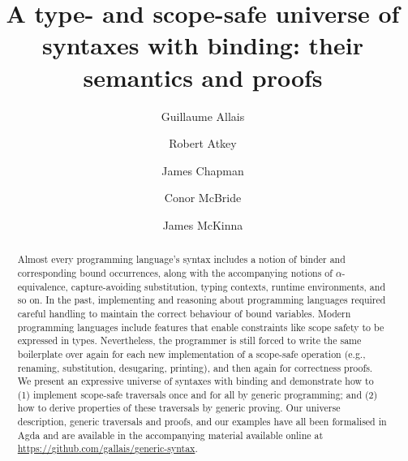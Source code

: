 \documentclass{jfp}
\begin{document}


\totalpg{\pageref{lastpage01}}

\title{A type- and scope-safe universe of syntaxes with binding: their semantics and proofs}

\begin{authgrp}
  \author{Guillaume Allais}\\
  \author{Robert Atkey}
  \author{James Chapman}
  \author{Conor McBride}
  \author{James McKinna}
\end{authgrp}


\begin{abstract}
Almost every programming language's syntax includes a notion of binder
and corresponding bound occurrences, along with the accompanying
notions of $\alpha$-equivalence, capture-avoiding substitution, typing
contexts, runtime environments, and so on. In the past, implementing
and reasoning about programming languages required careful handling to
maintain the correct behaviour of bound variables. Modern programming
languages include features that enable constraints like scope safety
to be expressed in types. Nevertheless, the programmer is still forced
to write the same boilerplate over again for each new implementation
of a scope-safe operation (e.g., renaming, substitution, desugaring,
printing), and then again for correctness proofs.
We present an expressive universe of syntaxes with binding and
demonstrate how to (1) implement scope-safe traversals once and for
all by generic programming; and (2) how to derive properties of these
traversals by generic proving. Our universe description, generic
traversals and proofs, and our examples have all been formalised in
Agda and are available in the accompanying material available online
at \url{https://github.com/gallais/generic-syntax}.
\end{abstract}

\maketitle
\end{document}

